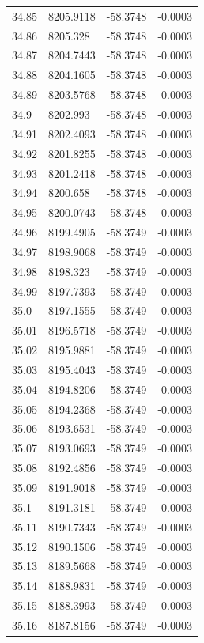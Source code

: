 \begin{table}[H]
\begin{tabular}{llll}
34.85 & 8205.9118 & -58.3748 & -0.0003 \\
34.86 & 8205.328 & -58.3748 & -0.0003 \\
34.87 & 8204.7443 & -58.3748 & -0.0003 \\
34.88 & 8204.1605 & -58.3748 & -0.0003 \\
34.89 & 8203.5768 & -58.3748 & -0.0003 \\
34.9 & 8202.993 & -58.3748 & -0.0003 \\
34.91 & 8202.4093 & -58.3748 & -0.0003 \\
34.92 & 8201.8255 & -58.3748 & -0.0003 \\
34.93 & 8201.2418 & -58.3748 & -0.0003 \\
34.94 & 8200.658 & -58.3748 & -0.0003 \\
34.95 & 8200.0743 & -58.3748 & -0.0003 \\
34.96 & 8199.4905 & -58.3749 & -0.0003 \\
34.97 & 8198.9068 & -58.3749 & -0.0003 \\
34.98 & 8198.323 & -58.3749 & -0.0003 \\
34.99 & 8197.7393 & -58.3749 & -0.0003 \\
35.0 & 8197.1555 & -58.3749 & -0.0003 \\
35.01 & 8196.5718 & -58.3749 & -0.0003 \\
35.02 & 8195.9881 & -58.3749 & -0.0003 \\
35.03 & 8195.4043 & -58.3749 & -0.0003 \\
35.04 & 8194.8206 & -58.3749 & -0.0003 \\
35.05 & 8194.2368 & -58.3749 & -0.0003 \\
35.06 & 8193.6531 & -58.3749 & -0.0003 \\
35.07 & 8193.0693 & -58.3749 & -0.0003 \\
35.08 & 8192.4856 & -58.3749 & -0.0003 \\
35.09 & 8191.9018 & -58.3749 & -0.0003 \\
35.1 & 8191.3181 & -58.3749 & -0.0003 \\
35.11 & 8190.7343 & -58.3749 & -0.0003 \\
35.12 & 8190.1506 & -58.3749 & -0.0003 \\
35.13 & 8189.5668 & -58.3749 & -0.0003 \\
35.14 & 8188.9831 & -58.3749 & -0.0003 \\
35.15 & 8188.3993 & -58.3749 & -0.0003 \\
35.16 & 8187.8156 & -58.3749 & -0.0003 \\

\end{tabular}
\end{table}
